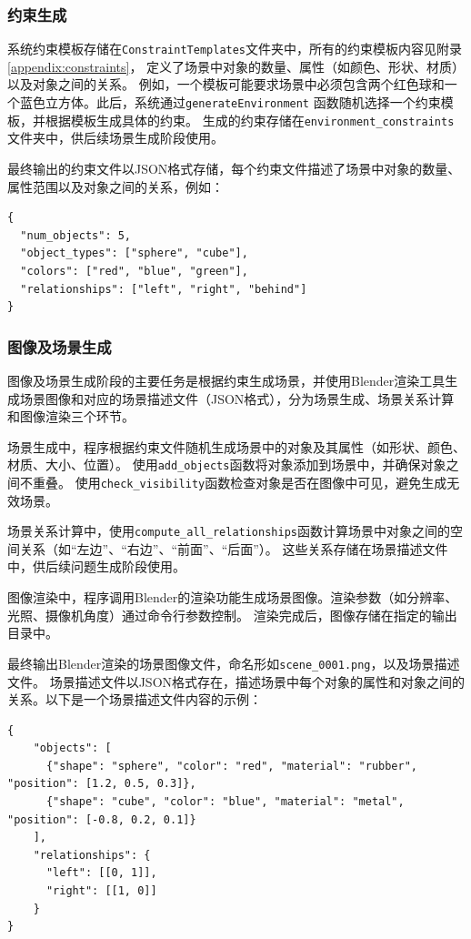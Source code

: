\subsubsection{约束生成}
系统约束模板存储在\texttt{ConstraintTemplates}文件夹中，所有的约束模板内容见附录\ref{appendix:constraints}，
定义了场景中对象的数量、属性（如颜色、形状、材质）以及对象之间的关系。
例如，一个模板可能要求场景中必须包含两个红色球和一个蓝色立方体。此后，系统通过\texttt{generateEnvironment}
函数随机选择一个约束模板，并根据模板生成具体的约束。
生成的约束存储在\texttt{environment\_constraints}文件夹中，供后续场景生成阶段使用。

最终输出的约束文件以JSON格式存储，每个约束文件描述了场景中对象的数量、属性范围以及对象之间的关系，例如：
\begin{lstlisting}
{
  "num_objects": 5,
  "object_types": ["sphere", "cube"],
  "colors": ["red", "blue", "green"],
  "relationships": ["left", "right", "behind"]
}
\end{lstlisting}
\subsubsection{图像及场景生成}
图像及场景生成阶段的主要任务是根据约束生成场景，并使用Blender渲染工具生成场景图像和对应的场景描述文件（JSON格式），分为场景生成、场景关系计算和图像渲染三个环节。

场景生成中，程序根据约束文件随机生成场景中的对象及其属性（如形状、颜色、材质、大小、位置）。
使用\texttt{add\_objects}函数将对象添加到场景中，并确保对象之间不重叠。
使用\texttt{check\_visibility}函数检查对象是否在图像中可见，避免生成无效场景。

场景关系计算中，使用\texttt{compute\_all\_relationships}函数计算场景中对象之间的空间关系（如“左边”、“右边”、“前面”、“后面”）。
这些关系存储在场景描述文件中，供后续问题生成阶段使用。

图像渲染中，程序调用Blender的渲染功能生成场景图像。渲染参数（如分辨率、光照、摄像机角度）通过命令行参数控制。
渲染完成后，图像存储在指定的输出目录中。

最终输出Blender渲染的场景图像文件，命名形如\texttt{scene\_0001.png}，以及场景描述文件。
场景描述文件以JSON格式存在，描述场景中每个对象的属性和对象之间的关系。以下是一个场景描述文件内容的示例：
\begin{lstlisting}
{
    "objects": [
      {"shape": "sphere", "color": "red", "material": "rubber", "position": [1.2, 0.5, 0.3]},
      {"shape": "cube", "color": "blue", "material": "metal", "position": [-0.8, 0.2, 0.1]}
    ],
    "relationships": {
      "left": [[0, 1]],
      "right": [[1, 0]]
    }
}
\end{lstlisting}
